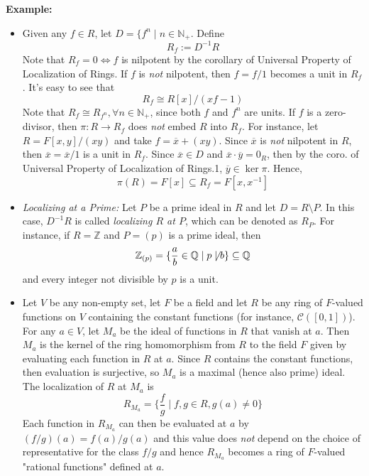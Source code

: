\noindent\textbf{Example:} \begin{itemize}
    \item Given any $f\in R$, let $D= \{f^n \mid n \in \mathbb{
    N
    }_+$. Define
    $$R_f:=D^{-1}R$$
    Note that $R_f=0 \Leftrightarrow f$ is nilpotent by the corollary of Universal Property of Localization of Rings. If $f$ is \textit{not} nilpotent, then $f=f/1$ becomes a unit in $R_f$. It's easy to see that
    $$R_f \cong R[x]/ (xf-1)$$
    Note that $R_f \cong R_{f^n}, \forall n\in \mathbb{
    N
    }_+$, since both $f$ and $f^n$ are units. If $f$ is a zero-divisor, then $\pi: R\to R_f$ does \textit{not} embed $R$ into $R_f$. For instance, let $R= F[x,y]/ (xy)$ and take $f= \overline{x} +(xy)$. Since $\overline{x}$ is \textit{not} nilpotent in $R$, then $\overline{x}=\overline{x}/1$ is a unit in $R_f$. Since $\overline{x} \in D$ and $\overline{x} \cdot \overline{y}=0_R$, then by the coro. of Universal Property of Localization of Rings.1, $\overline{y} \in \ker \pi$. Hence, 
    $$\pi(R)=F[x] \subseteq R_f =F[x,x^{-1}]$$

    \item \textit{Localizing at a Prime:} Let $P$ be a prime ideal in $R$ and let $D=R\setminus P$. In this case, $D^{-1}R$ is called \textit{localizing $R$ at $P$}, which can be denoted as $R_P$. For instance, if $R=\mathbb{Z}$ and $P=(p)$ is a prime ideal, then
    $$\mathbb{Z}_{(p)} =\{ \frac{a}{b} \in \mathbb{Q} \mid p\not \mid b\} \subseteq \mathbb{Q}$$
    and every integer not divisible by $p$ is a unit.

    \item Let $V$ be any non-empty set, let $F$ be a field and let $R$ be any ring of $F$-valued functions on $V$ containing the constant functions (for instance, $\mathcal{C} ([0,1])$). For any $a\in V$, let $M_a$ be the ideal of functions in $R$ that vanish at $a$. Then $M_a$ is the kernel of the ring homomorphism from $R$ to the field $F$ given by  evaluating each function in $R$ at $a$. Since $R$ contains the constant functions, then evaluation is surjective, so $M_a$ is a maximal (hence also prime) ideal. The localization of $R$ at $M_a$ is
    $$R_{M_a} = \{\frac{f}{g} \mid f,g\in R,g(a) \neq 0\}$$
    Each function in $R_{M_a}$ can then be evaluated at $a$ by $(f/g) (a) = f(a)/g(a)$ and this value does \textit{not} depend on the choice of representative for the class $f/g$ and hence $R_{M_a}$ becomes a ring of $F$-valued "rational functions" defined at $a$.
\end{itemize}


